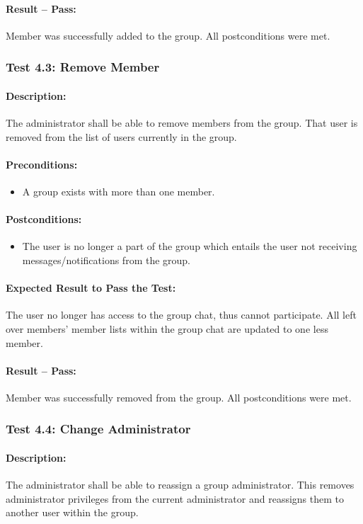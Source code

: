 \documentclass[11pt]{article}
\begin{document}
\paragraph{Result -- Pass:}
Member was successfully added to the group. All postconditions were met.
\subsubsection{Test 4.3: Remove Member}
\paragraph{Description:}
The administrator shall be able to remove members from the group. That user is removed from the list of users currently in the group.
\paragraph{Preconditions:} 
\begin{itemize}
\item A group exists with more than one member.
\end{itemize}
\paragraph{Postconditions:}
\begin{itemize}
\item The user is no longer a part of the group which entails the user not receiving messages/notifications from the group.
\end{itemize}
\paragraph{Expected Result to Pass the Test:}
The user no longer has access to the group chat, thus cannot participate. All left over members' member lists within the group chat are updated to one less member.
\paragraph{Result -- Pass:}
Member was successfully removed from the group. All postconditions were met.
\subsubsection{Test 4.4: Change Administrator}
\paragraph{Description:}
The administrator shall be able to reassign a group
administrator. This removes administrator privileges from the current administrator and reassigns them to another user within the group.
\end{document}
